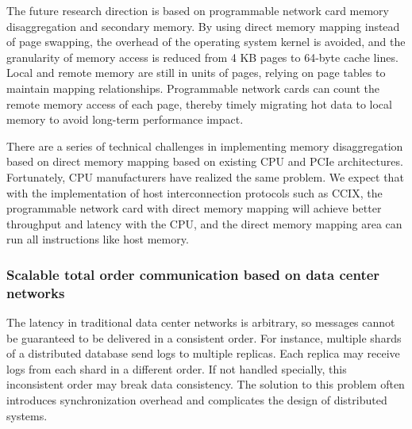 The future research direction is based on programmable network card memory disaggregation and secondary memory. By using direct memory mapping instead of page swapping, the overhead of the operating system kernel is avoided, and the granularity of memory access is reduced from 4 KB pages to 64-byte cache lines. Local and remote memory are still in units of pages, relying on page tables to maintain mapping relationships. Programmable network cards can count the remote memory access of each page, thereby timely migrating hot data to local memory to avoid long-term performance impact.

There are a series of technical challenges in implementing memory disaggregation based on direct memory mapping based on existing CPU and PCIe architectures. Fortunately, CPU manufacturers have realized the same problem. We expect that with the implementation of host interconnection protocols such as CCIX, the programmable network card with direct memory mapping will achieve better throughput and latency with the CPU, and the direct memory mapping area can run all instructions like host memory.

\subsubsection{Scalable total order communication based on data center networks}
\label{future:system-network-codesign}

The latency in traditional data center networks is arbitrary, so messages cannot be guaranteed to be delivered in a consistent order. For instance, multiple shards of a distributed database send logs to multiple replicas. Each replica may receive logs from each shard in a different order. If not handled specially, this inconsistent order may break data consistency. The solution to this problem often introduces synchronization overhead and complicates the design of distributed systems.

